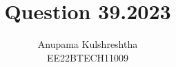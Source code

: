 \documentclass[]{article}
\title{Question 39.2023}
\author{Anupama Kulshreshtha \\ EE22BTECH11009}
\date{}
\theoremstyle{remark}
\begin{document}
\maketitle
\providecommand{\pr}[1]{\ensuremath{\Pr\left(#1\right)}}
\providecommand{\prt}[2]{\ensuremath{p_{#1}^{\left(#2\right)} }}        %
\providecommand{\qfunc}[1]{\ensuremath{Q\left(#1\right)}}
\providecommand{\sbrak}[1]{\ensuremath{{}\left[#1\right]}}
\providecommand{\lsbrak}[1]{\ensuremath{{}\left[#1\right.}}
\providecommand{\rsbrak}[1]{\ensuremath{{}\left.#1\right]}}
\providecommand{\brak}[1]{\ensuremath{\left(#1\right)}}
\providecommand{\lbrak}[1]{\ensuremath{\left(#1\right.}}
\providecommand{\rbrak}[1]{\ensuremath{\left.#1\right)}}
\providecommand{\cbrak}[1]{\ensuremath{\left\{#1\right\}}}
\providecommand{\lcbrak}[1]{\ensuremath{\left\{#1\right.}}
\providecommand{\rcbrak}[1]{\ensuremath{\left.#1\right\}}}
\newcommand{\sgn}{\mathop{\mathrm{sgn}}}
\providecommand{\abs}[1]{\left\vert#1\right\vert}
\providecommand{\res}[1]{\Res\displaylimits_{#1}} 
\providecommand{\norm}[1]{\left\lVert#1\right\rVert}
\providecommand{\mtx}[1]{\mathbf{#1}}
\providecommand{\mean}[1]{E\left[ #1 \right]}
\providecommand{\cond}[2]{#1\middle|#2}
\providecommand{\fourier}{\overset{\mathcal{F}}{ \rightleftharpoons}}
\newenvironment{amatrix}[1]{%
  \left(\begin{array}{@{}*{#1}{c}|c@{}}
}{%
  \end{array}\right)
}
\newcommand{\solution}{\noindent \textbf{Solution: }}
\newcommand{\cosec}{\,\text{cosec}\,}
\providecommand{\dec}[2]{\ensuremath{\overset{#1}{\underset{#2}{\gtrless}}}}
\newcommand{\myvec}[1]{\ensuremath{\begin{pmatrix}#1\end{pmatrix}}}
\newcommand{\mydet}[1]{\ensuremath{\begin{vmatrix}#1\end{vmatrix}}}
\newcommand{\myaugvec}[2]{\ensuremath{\begin{amatrix}{#1}#2\end{amatrix}}}
\providecommand{\rank}{\text{rank}}
\providecommand{\pr}[1]{\ensuremath{\Pr\left(#1\right)}}
\providecommand{\qfunc}[1]{\ensuremath{Q\left(#1\right)}}
	\newcommand*{\permcomb}[4][0mu]{{{}^{#3}\mkern#1#2_{#4}}}
\newcommand*{\perm}[1][-3mu]{\permcomb[#1]{P}}
\newcommand*{\comb}[1][-1mu]{\permcomb[#1]{C}}
\end{document}
